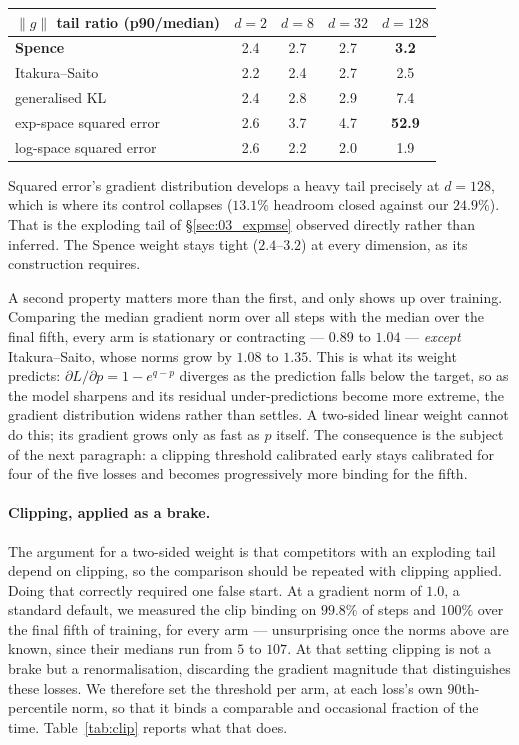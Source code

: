\begin{center}\small
\begin{tabular}{lcccc}
\toprule
$\|g\|$ tail ratio (p90/median) & $d=2$ & $d=8$ & $d=32$ & $d=128$\\
\midrule
\textbf{Spence}              & 2.4 & 2.7 & 2.7 & \textbf{3.2}\\
Itakura--Saito               & 2.2 & 2.4 & 2.7 & 2.5\\
generalised KL               & 2.4 & 2.8 & 2.9 & 7.4\\
exp-space squared error      & 2.6 & 3.7 & 4.7 & \textbf{52.9}\\
log-space squared error      & 2.6 & 2.2 & 2.0 & 1.9\\
\bottomrule
\end{tabular}
\end{center}

Squared error's gradient distribution develops a heavy tail precisely at
$d=128$, which is where its control collapses ($13.1\%$ headroom closed against
our $24.9\%$). That is the exploding tail of \S\ref{sec:03_expmse} observed
directly rather than inferred. The Spence weight stays tight ($2.4$--$3.2$) at
every dimension, as its construction requires.

A second property matters more than the first, and only shows up over training.
Comparing the median gradient norm over all steps with the median over the
final fifth, every arm is stationary or contracting --- $0.89$ to $1.04$ ---
\emph{except} Itakura--Saito, whose norms grow by $1.08$ to $1.35$. This is
what its weight predicts: $\partial L/\partial p = 1-e^{q-p}$ diverges as the
prediction falls below the target, so as the model sharpens and its residual
under-predictions become more extreme, the gradient distribution widens rather
than settles. A two-sided linear weight cannot do this; its gradient grows only
as fast as $p$ itself. The consequence is the subject of the next paragraph:
a clipping threshold calibrated early stays calibrated for four of the five
losses and becomes progressively more binding for the fifth.

\paragraph{Clipping, applied as a brake.}
\label{par:clipped}
The argument for a two-sided weight is that competitors with an exploding tail
depend on clipping, so the comparison should be repeated with clipping applied.
Doing that correctly required one false start. At a gradient norm of $1.0$, a
standard default, we measured the clip binding on $99.8\%$ of steps and $100\%$
over the final fifth of training, for every arm --- unsurprising once the norms
above are known, since their medians run from $5$ to $107$. At that setting
clipping is not a brake but a renormalisation, discarding the gradient
magnitude that distinguishes these losses. We therefore set the threshold
per arm, at each loss's own $90$th-percentile norm, so that it binds a
comparable and occasional fraction of the time. Table~\ref{tab:clip} reports
what that does.

